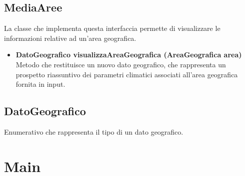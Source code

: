 \documentclass[a4paper, 12pt]{scrreprt}
\begin{document}
			\subsection{MediaAree}
			La classe che implementa questa interfaccia permette di visualizzare le informazioni relative ad un'area geografica.
			\begin{itemize}
				\item\textbf {DatoGeografico visualizzaAreaGeografica (AreaGeografica area)}
				\\Metodo che restituisce un nuovo dato geografico, che rappresenta un prospetto riassuntivo dei parametri climatici associati all'area geografica fornita in input.
			\end{itemize}
			\subsection{DatoGeografico}
			Enumerativo che rappresenta il tipo di un dato geografico.


		\section{Main}

	\nocite{IuriTex}
	
	
	\printindex
\end{document}
